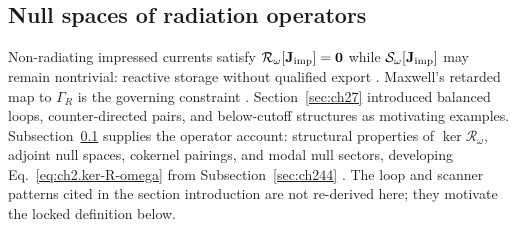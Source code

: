 \subsection{Null spaces of radiation operators}
\label{sec:ch271}

Non-radiating impressed currents satisfy $\mathcal{R}_\omega[\mathbf{J}_{\mathrm{imp}}]=\mathbf{0}$ while
$\mathcal{S}_\omega[\mathbf{J}_{\mathrm{imp}}]$ may remain nontrivial: reactive storage without qualified export
\cite{stratton1941,devaney2004}. Maxwell's retarded map to $\Gamma_R$ is the governing constraint
\cite{maxwell1873}. Section~\ref{sec:ch27} introduced balanced loops, counter-directed pairs, and
below-cutoff structures as motivating examples. Subsection~\ref{sec:ch271} supplies the operator
account: structural properties of
$\ker\mathcal{R}_\omega$, adjoint null spaces, cokernel pairings, and modal null sectors,
developing Eq.~\eqref{eq:ch2.ker-R-omega} from Subsection~\ref{sec:ch244}
\cite{stratton1941}. The loop and scanner patterns cited in the section introduction are not
re-derived here; they motivate the locked definition below.

